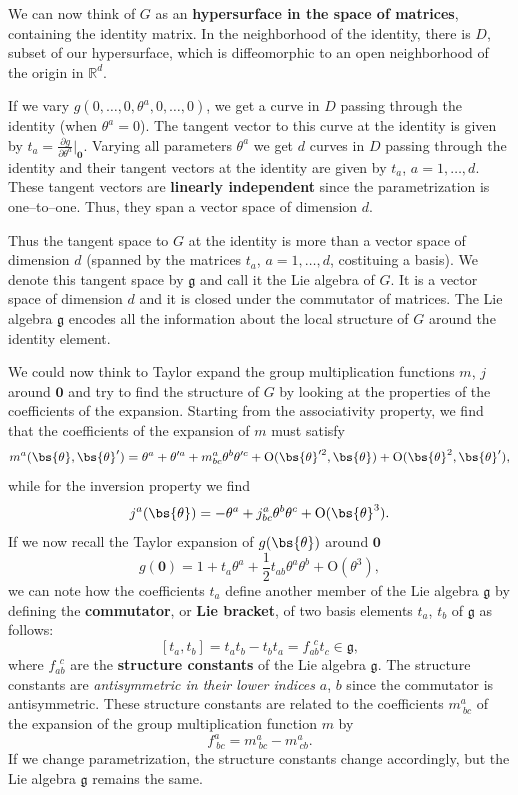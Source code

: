 We can now think of \(G\) as an \textbf{hypersurface in the space of matrices}, containing the identity matrix. In the neighborhood of the identity, there is \(D\), subset of our hypersurface, which is diffeomorphic to an open neighborhood of the origin in \(\mathbb{R}^d\).

If we vary \(g(0,\dots,0,\theta^a,0,\dots,0)\), we get a curve in \(D\) passing through the identity (when \(\theta^a = 0\)). The tangent vector to this curve at the identity is given by \(t_a = \frac{\partial g}{\partial \theta^a} \big|_{\mathbf{0}}\). Varying all parameters \(\theta^a\) we get \(d\) curves in \(D\) passing through the identity and their tangent vectors at the identity are given by \(t_a\), \(a = 1, \ldots, d\). These tangent vectors are \textbf{linearly independent} since the parametrization is one–to–one. Thus, they span a vector space of dimension \(d\).

Thus the tangent space to \(G\) at the identity is more than a vector space of dimension \(d\) (spanned by the matrices \(t_a\), \(a = 1, \ldots, d\), costituing a basis). We denote this tangent space by \(\mathfrak{g}\) and call it the Lie algebra of \(G\).
It is a vector space of dimension \(d\) and it is closed under the commutator of matrices. The Lie algebra \(\mathfrak{g}\) encodes all the information about the local structure of \(G\) around the identity element.

We could now think to Taylor expand the group multiplication functions \(m\), \(j\) around \(\mathbf{0}\) and try to find the structure of \(G\) by looking at the properties of the coefficients of the expansion. Starting from the associativity property, we find that the coefficients of the expansion of \(m\) must satisfy
\[
    m^a(\bs{\theta}, \bs{\theta}') = \theta^a + \theta'^a + m^a_{bc} \theta^b \theta'^c + \mathrm{O}(\bs{\theta}'^2, \bs{\theta}) + \mathrm{O}(\bs{\theta}^2, \bs{\theta}'),
\]
while for the inversion property we find
\[
    j^a(\bs{\theta}) = -\theta^a + j^a_{bc} \theta^b \theta^c + \mathrm{O}(\bs{\theta}^3).
\]
If we now recall the Taylor expansion of \(g(\bs{\theta})\) around \(\mathbf{0}\)
\[
    g(\mathbf{0}) = 1 + t_a \theta^a + \frac{1}{2} t_{ab} \theta^a \theta^b + \mathrm{O}(\theta^3),
\]
we can note how the coefficients \(t_a\) define another member of the Lie algebra \(\mathfrak{g}\) by defining the \textbf{commutator}, or \textbf{Lie bracket}, of two basis elements \(t_a\), \(t_b\) of \(\mathfrak{g}\) as follows:
\[
    [t_a, t_b] = t_a t_b - t_b t_a = f_{ab}^{\ \ c} t_c \in \mathfrak{g},
\]
where \(f_{ab}^{\ \ c}\) are the \textbf{structure constants} of the Lie algebra \(\mathfrak{g}\). The structure constants are \textit{antisymmetric in their lower indices} \(a\), \(b\) since the commutator is antisymmetric. These structure constants are related to the coefficients \(m^a_{\ bc}\) of the expansion of the group multiplication function \(m\) by
\[
    f^a_{\ bc} = m^a_{\ bc} - m^a_{\ cb}.
\]
If we change parametrization, the structure constants change accordingly, but the Lie algebra \(\mathfrak{g}\) remains the same.

